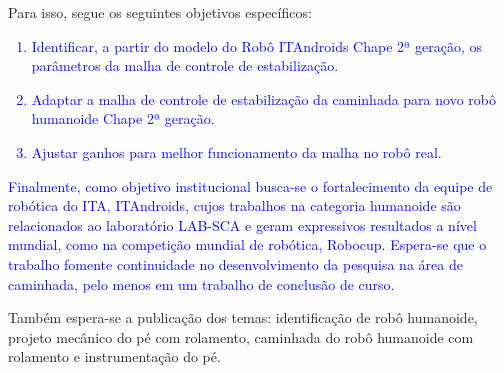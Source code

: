 Para isso, segue os  seguintes objetivos específicos:

\textcolor{blue}{
\begin{enumerate}
\item Identificar, a partir do modelo do Robô ITAndroids Chape 2ª geração, os parâmetros da malha de controle de estabilização.
\item Adaptar a malha de controle de estabilização da caminhada para novo robô humanoide Chape 2ª geração.
\item Ajustar ganhos para melhor funcionamento da malha no robô real.
\end{enumerate}}

\textcolor{blue}{Finalmente, como objetivo institucional busca-se o fortalecimento da equipe de robótica do ITA, ITAndroids, cujos trabalhos na categoria humanoide são relacionados ao laboratório LAB-SCA e geram expressivos resultados a nível mundial, como na competição mundial de robótica, Robocup. Espera-se que o trabalho fomente continuidade no desenvolvimento da pesquisa na área de caminhada, pelo menos em um trabalho de conclusão de curso.}



Também espera-se a publicação dos temas: identificação de robô humanoide, projeto mecânico do pé com rolamento, caminhada do robô humanoide com rolamento e instrumentação do pé. 

